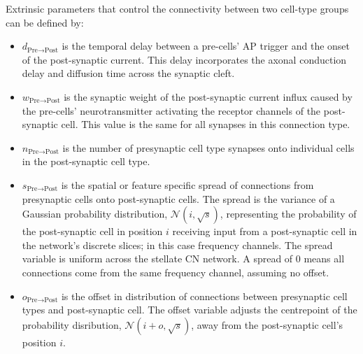 
Extrinsic parameters that control the connectivity between two cell-type groups can be defined by:
\begin{itemize}
\item $d_{\textrm{{Pre}}\to\textrm{{Post}}}\xspace$ is the temporal delay
  between a pre-cells' AP trigger and the onset of the post-synaptic current.  This
  delay incorporates the axonal conduction delay and diffusion time across the
  synaptic cleft.
\item $w_{\textrm{{Pre}}\to\textrm{{Post}}}\xspace$ is the synaptic weight of
  the post-synaptic current influx caused by the pre-cells' neurotransmitter
  activating the receptor channels of the post-synaptic cell.  This value is the
  same for all synapses in this connection type.
\item $n_{\textrm{{Pre}}\to\textrm{{Post}}}\xspace$ is the number of presynaptic
  cell type synapses onto individual cells in the post-synaptic cell type.
\item $s_{\textrm{{Pre}}\to\textrm{{Post}}}\xspace$ is the spatial or feature
  specific spread of connections from presynaptic cells onto post-synaptic
  cells.  The spread is the variance of a Gaussian probability distribution,
  $\mathcal{N}(i,\sqrt{s})$, representing the probability of the post-synaptic
  cell in position $i$ receiving input from a post-synaptic cell in the
  network's discrete slices; in this case frequency channels.  The spread
  variable is uniform across the stellate CN network.  A spread of 0 means all
  connections come from the same frequency channel, assuming no offset.
\item $o_{\textrm{{Pre}}\to\textrm{{Post}}}\xspace$ is the offset in
  distribution of connections between presynaptic cell types and post-synaptic
  cell. The offset variable adjusts the centrepoint of the probability
  disribution, $\mathcal{N}(i + o, \sqrt{s})$, away from the post-synaptic
  cell's position $i$.
\end{itemize}





